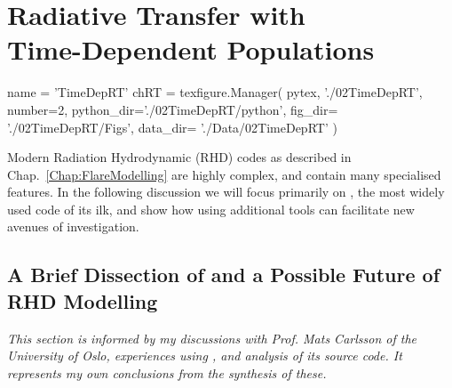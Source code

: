 \chapter{Radiative Transfer with\\Time-Dependent Populations}\label{Chap:TimeDepRt}
\begin{pycode}[TimeDepRT]
name = 'TimeDepRT'
chRT = texfigure.Manager(
    pytex,
    './02TimeDepRT',
    number=2,
    python_dir='./02TimeDepRT/python',
    fig_dir=   './02TimeDepRT/Figs',
    data_dir=  './Data/02TimeDepRT'
)
\end{pycode}



Modern Radiation Hydrodynamic (RHD) codes as described in Chap.~\ref{Chap:FlareModelling} are highly complex, and contain many specialised features.
In the following discussion we will focus primarily on \Radyn{}, the most widely used code of its ilk, and show how using additional tools can facilitate new avenues of investigation.

\section{A Brief Dissection of \Radyn{} and a Possible Future of RHD Modelling}\label{Sec:RadynDissection}

\emph{This section is informed by my discussions with Prof. Mats Carlsson of the University of Oslo, experiences using \Radyn{}, and analysis of its source code. It represents my own conclusions from the synthesis of these.}

